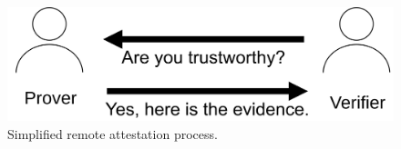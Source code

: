 \begin{figure}[htpb]
  \centering
  \includegraphics[width=0.5\linewidth]{figures/remote_attestation_process.pdf}
  \caption{Simplified remote attestation process.}\label{fig:ra_simple}
\end{figure}
